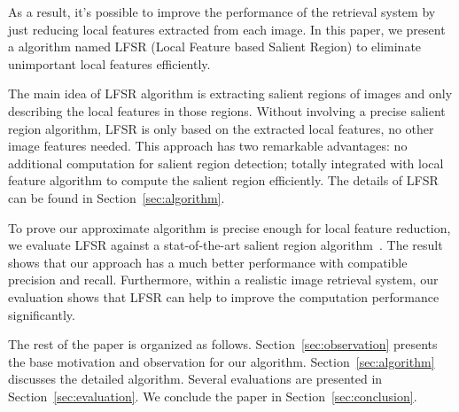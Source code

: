 As a result, it's possible to improve the performance of the retrieval system by just reducing local features extracted from each image. In this paper, we present a algorithm named LFSR (Local Feature based Salient Region) to eliminate unimportant local features efficiently.

The main idea of LFSR algorithm is extracting salient regions of images and only describing the local features in those regions. Without involving a precise salient region algorithm, LFSR is only based on the extracted local features, no other image features needed. This approach has two remarkable advantages: no additional computation for salient region detection; totally integrated with local feature algorithm to compute the salient region efficiently. The details of LFSR can be found in Section~\ref{sec:algorithm}. 

To prove our approximate algorithm is precise enough for local feature reduction, we evaluate LFSR against a stat-of-the-art salient region algorithm~\cite{achanta2009frequency}. The result shows that our approach has a much better performance with compatible precision and recall. Furthermore, within a realistic image retrieval system, our evaluation shows that LFSR can help to improve the computation performance significantly.

The rest of the paper is organized as follows. Section~\ref{sec:observation} presents the base motivation and observation for our algorithm. Section~\ref{sec:algorithm} discusses the detailed algorithm. Several evaluations are presented in Section~\ref{sec:evaluation}. We conclude the paper in Section~\ref{sec:conclusion}.